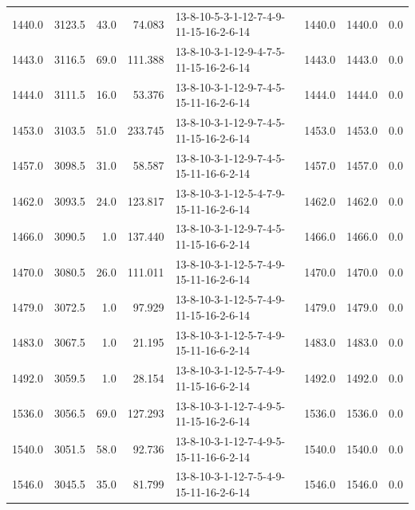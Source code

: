 \begin{tabular}{rrrrlrrr}
 1440.0 &  3123.5 &           43.0 &             74.083 &  13-8-10-5-3-1-12-7-4-9-11-15-16-2-6-14 &        1440.0 &          1440.0 &       0.0 \\
 1443.0 &  3116.5 &           69.0 &            111.388 &  13-8-10-3-1-12-9-4-7-5-11-15-16-2-6-14 &        1443.0 &          1443.0 &       0.0 \\
 1444.0 &  3111.5 &           16.0 &             53.376 &  13-8-10-3-1-12-9-7-4-5-15-11-16-2-6-14 &        1444.0 &          1444.0 &       0.0 \\
 1453.0 &  3103.5 &           51.0 &            233.745 &  13-8-10-3-1-12-9-7-4-5-11-15-16-2-6-14 &        1453.0 &          1453.0 &       0.0 \\
 1457.0 &  3098.5 &           31.0 &             58.587 &  13-8-10-3-1-12-9-7-4-5-15-11-16-6-2-14 &        1457.0 &          1457.0 &       0.0 \\
 1462.0 &  3093.5 &           24.0 &            123.817 &  13-8-10-3-1-12-5-4-7-9-15-11-16-2-6-14 &        1462.0 &          1462.0 &       0.0 \\
 1466.0 &  3090.5 &            1.0 &            137.440 &  13-8-10-3-1-12-9-7-4-5-11-15-16-6-2-14 &        1466.0 &          1466.0 &       0.0 \\
 1470.0 &  3080.5 &           26.0 &            111.011 &  13-8-10-3-1-12-5-7-4-9-15-11-16-2-6-14 &        1470.0 &          1470.0 &       0.0 \\
 1479.0 &  3072.5 &            1.0 &             97.929 &  13-8-10-3-1-12-5-7-4-9-11-15-16-2-6-14 &        1479.0 &          1479.0 &       0.0 \\
 1483.0 &  3067.5 &            1.0 &             21.195 &  13-8-10-3-1-12-5-7-4-9-15-11-16-6-2-14 &        1483.0 &          1483.0 &       0.0 \\
 1492.0 &  3059.5 &            1.0 &             28.154 &  13-8-10-3-1-12-5-7-4-9-11-15-16-6-2-14 &        1492.0 &          1492.0 &       0.0 \\
 1536.0 &  3056.5 &           69.0 &            127.293 &  13-8-10-3-1-12-7-4-9-5-11-15-16-2-6-14 &        1536.0 &          1536.0 &       0.0 \\
 1540.0 &  3051.5 &           58.0 &             92.736 &  13-8-10-3-1-12-7-4-9-5-15-11-16-6-2-14 &        1540.0 &          1540.0 &       0.0 \\
 1546.0 &  3045.5 &           35.0 &             81.799 &  13-8-10-3-1-12-7-5-4-9-15-11-16-2-6-14 &        1546.0 &          1546.0 &       0.0 \\

\end{tabular}
